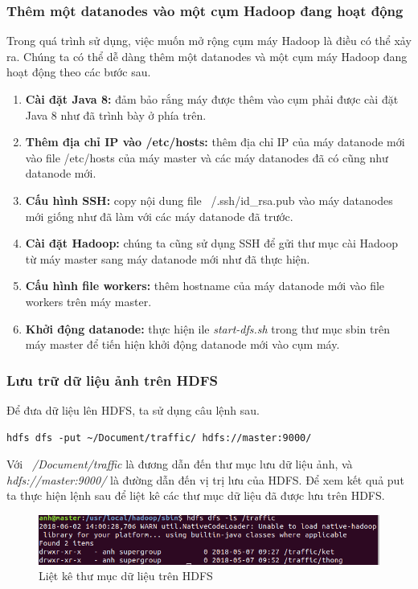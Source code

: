 	\subsubsection{Thêm một datanodes vào một cụm Hadoop đang hoạt động}
	Trong quá trình sử dụng, việc muốn mở rộng cụm máy Hadoop là điều có thể xảy ra. Chúng ta có thể dễ dàng thêm một datanodes và một cụm máy Hadoop đang hoạt động theo các bước sau.
	\begin{enumerate}
		\item \textbf{Cài đặt Java 8: }đảm bảo rắng máy được thêm vào cụm phải được cài đặt Java 8 như đã trình bày ở phía trên.
		\item \textbf{Thêm địa chỉ IP vào /etc/hosts: }thêm địa chỉ IP của máy datanode mới vào file /etc/hosts của máy master và các máy datanodes đã có cũng như datanode mới.
		\item \textbf{Cấu hình SSH: }copy nội dung file ~/.ssh/id\_rsa.pub vào máy datanodes mới giống như đã làm với các máy datanode đã trước.
		\item \textbf{Cài đặt Hadoop: }chúng ta cũng sử dụng SSH để gửi thư mục cài Hadoop từ máy master sang máy datanode mới như đã thực hiện.
		\item \textbf{Cấu hình file workers: }thêm hostname của máy datanode mới vào file workers trên máy master.
		\item \textbf{Khởi động datanode: }thực hiện ile \textit{start-dfs.sh} trong thư mục sbin trên máy master để tiến hiện khởi động datanode mới vào cụm máy.
	\end{enumerate}
		
	\subsubsection{Lưu trữ dữ liệu ảnh trên HDFS}
	Để đưa dữ liệu lên HDFS, ta sử dụng câu lệnh sau.
	\begin{lstlisting}
hdfs dfs -put ~/Document/traffic/ hdfs://master:9000/
	\end{lstlisting}
	Với \textit{~/Document/traffic} là đương dẫn đến thư mục lưu dữ liệu ảnh, và \textit{hdfs://master:9000/} là đường dẫn đến vị trị lưu của HDFS. Để xem kết quả put ta thực hiện lệnh sau để liệt kê các thư mục dữ liệu đã được lưu trên HDFS.
	\begin{figure}[h!]
				\centering
				\includegraphics[scale=0.6]{charts/dfs-ls.png}
				\caption{Liệt kê thư mục dữ liệu trên HDFS}
				\label{fig:dfs-ls}
	\end{figure}
	
